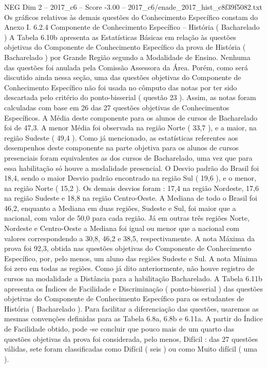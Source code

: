 \begin{textsample}{NEG Dim 2 – 2017\_c6 – Score -3.00 – 2017\_c6/enade\_2017\_hist\_c8f39f5082.txt}
Os gráficos relativos às demais questões do Conhecimento Específico constam do Anexo I. 6.2.4 Componente de Conhecimento Específico – História ( Bacharelado ) A Tabela 6.10b apresenta as Estatísticas Básicas em relação às questões objetivas do Componente de Conhecimento Específico da prova de História ( Bacharelado ) por Grande Região segundo a Modalidade de Ensino.
Nenhuma das questões foi anulada pela Comissão Assessora da Área.
Porém, como será discutido ainda nessa seção, uma das questões objetivas do Componente de Conhecimento Específico não foi usada no cômputo das notas por ter sido descartada pelo critério do ponto-bisserial ( questão 23 ).
Assim, as notas foram calculadas com base em 26 das 27 questões objetivas de Conhecimentos Específicos.
A Média deste componente para os alunos de cursos de Bacharelado foi de 47,3.
A menor Média foi observada na região Norte ( 33,7 ), e a maior, na região Sudeste ( 49,4 ).
Como já mencionado, as estatísticas referentes aos desempenhos deste componente na parte objetiva para os alunos de cursos presenciais foram equivalentes as dos cursos de Bacharelado, uma vez que para essa habilitação só houve a modalidade presencial.
O Desvio padrão do Brasil foi 18,4, sendo o maior Desvio padrão encontrado na região Sul ( 19,6 ), e o menor, na região Norte ( 15,2 ).
Os demais desvios foram : 17,4 na região Nordeste, 17,6 na região Sudeste e 18,8 na região Centro-Oeste.
A Mediana de todo o Brasil foi 46,2, enquanto a Mediana em duas regiões, Sudeste e Sul, foi maior que a nacional, com valor de 50,0 para cada região.
Já em outras três regiões Norte, Nordeste e Centro-Oeste a Mediana foi igual ou menor que a nacional com valores correspondendo a 30,8, 46,2 e 38,5, respectivamente.
A nota Máxima da prova foi 92,3, obtida nas questões objetivas do Componente de Conhecimento Específico, por, pelo menos, um aluno das regiões Sudeste e Sul.
A nota Mínima foi zero em todas as regiões.
Como já dito anteriormente, não houve registro de cursos na modalidade a Distância para a habilitação Bacharelado.
A Tabela 6.11b apresenta os Índices de Facilidade e Discriminação ( ponto-bisserial ) das questões objetivas do Componente de Conhecimento Específico para os estudantes de História ( Bacharelado ).
Para facilitar a diferenciação das questões, usaremos as mesmas convenções definidas para as Tabela 6.8a, 6.8b e 6.11a.
A partir do Índice de Facilidade obtido, pode -se concluir que pouco mais de um quarto das questões objetivas da prova foi considerada, pelo menos, Difícil : das 27 questões válidas, sete foram classificadas como Difícil ( seis ) ou como Muito difícil ( uma ).

\end{textsample}

